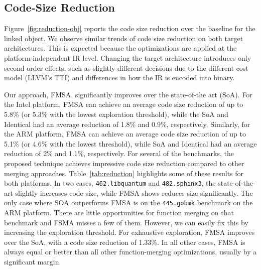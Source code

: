 \subsection{Code-Size Reduction}



Figure~\ref{fig:reduction-obj} reports the code size reduction over the baseline for the linked object. %
We observe similar trends of code size reduction on both target architectures. This is expected because the
optimizations are applied at the platform-independent IR level. Changing the target architecture introduces only second order effects,
such as slightly different decisions due to the different cost model (LLVM's TTI) and differences in how the IR is encoded into binary.

Our approach, FMSA, significantly improves over the state-of-the art (SoA). For the Intel platform, FMSA can achieve an average code size
reduction of up to 5.8\% (or 5.3\% with the lowest exploration threshold), while the SoA and Identical had an average reduction of 1.8\% and 0.9\%,
respectively. Similarly, for the ARM platform, FMSA can achieve an average code size reduction of up to 5.1\% (or 4.6\% with the lowest
threshold), while SoA and Identical had an average reduction of 2\% and 1.1\%, respectively. For several of the benchmarks, the
proposed technique achieves impressive code size reduction compared to other merging approaches. Table~\ref{tab:reduction} highlights
some of these results for both platforms. In two cases, \texttt{462.libquantum} and \texttt{482.sphinx3}, the state-of-the-art slightly
increases code size, while FMSA shows reduces size significantly.  The only case where SOA outperforms FMSA is on the \texttt{445.gobmk}
benchmark on the ARM platform. There are little opportunities for function merging on that benchmark and FSMA misses a few of them.
However, we can easily fix this by increasing the exploration threshold. For exhaustive exploration, FMSA improves over the SoA,
with a code size reduction of 1.33\%. In all other cases, FMSA is always equal or better than all other function-merging optimizations, usually by a significant margin.

